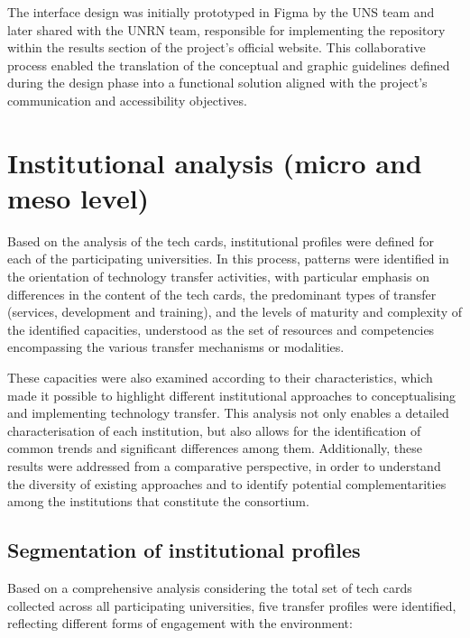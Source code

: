 \documentclass[
  12pt,
  oneside]{book}
\begin{document}
The interface design was initially prototyped in Figma by the UNS team
and later shared with the UNRN team, responsible for implementing the
repository within the results section of the project's official website.
This collaborative process enabled the translation of the conceptual and
graphic guidelines defined during the design phase into a functional
solution aligned with the project's communication and accessibility
objectives.

\section{Institutional analysis (micro and meso
level)}\label{institutional-analysis-micro-and-meso-level}

Based on the analysis of the tech cards, institutional profiles were
defined for each of the participating universities. In this process,
patterns were identified in the orientation of technology transfer
activities, with particular emphasis on differences in the content of
the tech cards, the predominant types of transfer (services, development
and training), and the levels of maturity and complexity of the
identified capacities, understood as the set of resources and
competencies encompassing the various transfer mechanisms or modalities.

These capacities were also examined according to their characteristics,
which made it possible to highlight different institutional approaches
to conceptualising and implementing technology transfer. This analysis
not only enables a detailed characterisation of each institution, but
also allows for the identification of common trends and significant
differences among them. Additionally, these results were addressed from
a comparative perspective, in order to understand the diversity of
existing approaches and to identify potential complementarities among
the institutions that constitute the consortium.

\subsection{Segmentation of institutional
profiles}\label{segmentation-of-institutional-profiles}

Based on a comprehensive analysis considering the total set of tech
cards collected across all participating universities, five transfer
profiles were identified, reflecting different forms of engagement with
the environment:
\end{document}
